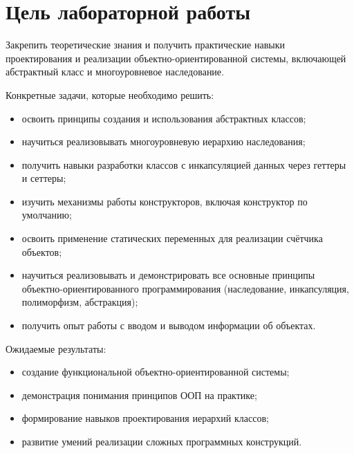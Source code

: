 \chapter*{Цель лабораторной работы}
\label{ch:Goal}


Закрепить теоретические знания и получить практические навыки проектирования и реализации объектно-ориентированной системы, включающей абстрактный класс и многоуровневое наследование. 

Конкретные задачи, которые необходимо решить:
\begin{itemize}
  \item{освоить принципы создания и использования абстрактных классов;}
  \item{научиться реализовывать многоуровневую иерархию наследования;}
  \item{получить навыки разработки классов с инкапсуляцией данных через геттеры и сеттеры;}
  \item{изучить механизмы работы конструкторов, включая конструктор по умолчанию;}
  \item{освоить применение статических переменных для реализации счётчика объектов;}
  \item{научиться реализовывать и демонстрировать все основные принципы объектно-ориентированного программирования (наследование, инкапсуляция, полиморфизм, абстракция);}
  \item{получить опыт работы с вводом и выводом информации об объектах.}
\end{itemize}

Ожидаемые результаты:
\begin{itemize}
  \item{создание функциональной объектно-ориентированной системы;}
  \item{демонстрация понимания принципов ООП на практике;}
  \item{формирование навыков проектирования иерархий классов;}
  \item{развитие умений реализации сложных программных конструкций.}
\end{itemize}

\endinput

